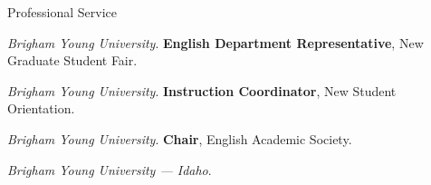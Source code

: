 \begin{rubric}{Professional Service}
        \par\emph{Brigham Young University}.
    \entry*[2017 -- 2018]%
        \textbf{English Department Representative}, New Graduate Student Fair.
        \par\emph{Brigham Young University}.
    \entry*[2018 -- 2019]%
        \textbf{Instruction Coordinator}, New Student Orientation.
        \par\emph{Brigham Young University}.
    \entry*[2013 -- 2015]%
        \textbf{Chair}, English Academic Society.
        \par\emph{Brigham Young University --- Idaho}.
    \end{rubric}